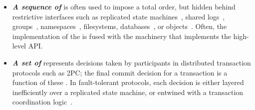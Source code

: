 
\begin{itemize}[leftmargin=*]
\item{\textbf{\textit{A sequence of \WORs{}}} is often used to impose a total order, but hidden behind restrictive interfaces such as replicated state machines~\cite{smr, rvrpaxos}, shared logs~\cite{corfu}, groups~\cite{GC, horus}, namespaces~\cite{chubby, zookeeper}, filesystems, databases~\cite{hyder}, or objects~\cite{tango}. Often, the implementation of the \WOR{} is fused with the machinery that implements the high-level API.}
\item{\textbf{\textit{A set of \WORs{}}} represents decisions taken by participants in distributed transaction protocols such as 2PC; the final commit decision for a transaction is a function of these \WORs{}. In fault-tolerant protocols, each decision \WOR{} is either layered inefficiently over a replicated state machine, or entwined with a transaction coordination logic~\cite{gray:2006}.} %
\end{itemize}



